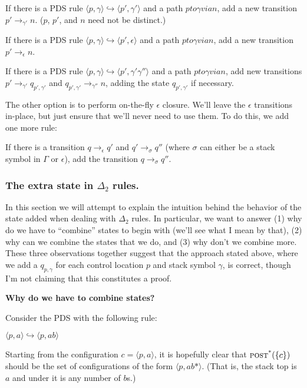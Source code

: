 \documentclass{article}
\newcommand{\Config}[2]{\ensuremath{\langle #1, #2 \rangle}}
\newcommand{\Rule}[2]{\ensuremath{#1 \hookrightarrow #2}}
\newcommand{\Trans}[3]{\ensuremath{#1 \rightarrow_{#2} #3}}
\newcommand{\epspath}[3]{\ensuremath{#1 to #2 via #3}}
\newcommand{\subsubsubsection}[1]{\textbf{#1}}
\newcommand{\poststar}{\ensuremath{\textsc{post}^\textsc{*}}}
\begin{document}
   If there is a PDS rule
   \Rule{\Config{p}{\gamma}}{\Config{p'}{\gamma'}} and a path
   \epspath{p}{\gamma}{n}, add a new transition
   \Trans{p'}{\gamma'}{n}. ($p$, $p'$, and $n$ need not be distinct.)

   If there is a PDS rule
   \Rule{\Config{p}{\gamma}}{\Config{p'}{\epsilon}} and a path
   \epspath{p}{\gamma}{n}, add a new transition
   \Trans{p'}{\epsilon}{n}.

   If there is a PDS rule
   \Rule{\Config{p}{\gamma}}{\Config{p'}{\gamma'\gamma''}} and a path
   \epspath{p}{\gamma}{n}, add new transitions
   \Trans{p'}{\gamma'}{q_{p',\gamma'}} and
   \Trans{q_{p',\gamma'}}{\gamma''}{n}, adding the state
   $q_{p',\gamma'}$ if necessary.


The other option is to perform on-the-fly $\epsilon$ closure. We'll
leave the $\epsilon$ transitions in-place, but just ensure that we'll
never need to use them. To do this, we add one more rule:

    If there is a transition \Trans{q}{\epsilon}{q'} and
    \Trans{q'}{\sigma}{q''} (where $\sigma$ can either be a stack
    symbol in $\Gamma$ or $\epsilon$), add the transition
    \Trans{q}{\sigma}{q''}.


\subsubsection{The extra state in $\Delta_2$ rules.}

In this section we will attempt to explain the intuition behind the
behavior of the state added when dealing with $\Delta_2$ rules.  In
particular, we want to answer (1) why do we have to ``combine'' states
to begin with (we'll see what I mean by that), (2) why can we combine
the states that we do, and (3) why don't we combine more. These three
observations together suggest that the approach stated above, where we
add a $q_{p,\gamma}$ for each control location $p$ and stack symbol
$\gamma$, is correct, though I'm not claiming that this constitutes a
proof.

\subsubsubsection{Why do we have to combine states?}

Consider the PDS with the following rule:

  \Rule{\Config{p}{a}}{\Config{p}{ab}}

Starting from the configuration $c = \Config{p}{a}$, it is hopefully
clear that $\poststar(\{c\})$ should be the set of configurations of
the form \Config{p}{ab*}. (That is, the stack top is $a$ and under it
is any number of $b$s.)
\end{document}
